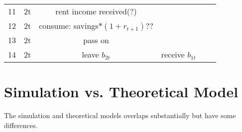\documentclass{article}
\begin{document}
\begin{table}
\begin{tabular}{rccccc}
        11 &         2t & rent income received(?) &            &            &            \\

        12 &         2t & consume: savings$\ast (1+r_{t+1}) ??$ &            &            &            \\

        13 &         2t &    pass on &            &            &            \\

        14 &         2t & leave $b_{2t}$ & receive  $b_{1t}$ &            &            \\
\bottomrule
\end{tabular}
\end{table}




\section{Simulation vs. Theoretical Model}

The simulation and theoretical models overlaps substantially but have some differences.
\end{document}
